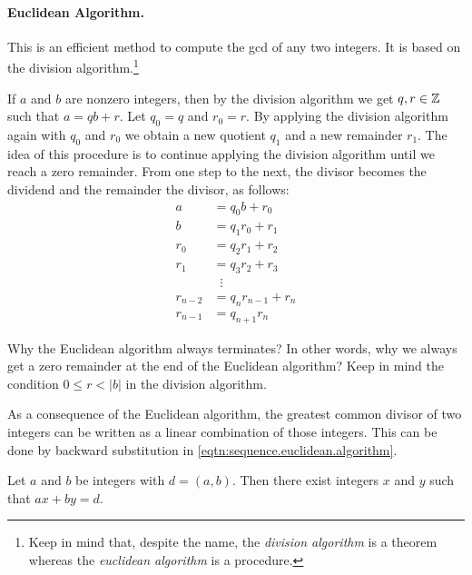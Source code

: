 \documentclass[11pt,a4paper]{article}
\begin{document}
\paragraph{Euclidean Algorithm.} This is an efficient method to compute the gcd of any  two integers.
It is based on the division algorithm.\footnote{Keep in mind that, despite the name, the \textit{division algorithm} is a theorem whereas the \textit{euclidean algorithm} is a procedure.}


If \(a\) and \(b\) are nonzero integers, then by the division algorithm we get \(q,r\in \mathbb{Z}\) such that \(a= qb+r\).
Let \(q_0=q\) and \(r_0=r\).
By applying the division algorithm again with \(q_0\) and \(r_0\) we obtain a new quotient \(q_1\)   and a new remainder \(r_1\).
The idea of this procedure is to continue applying the division algorithm until we reach a zero remainder. From one step to the next,  the divisor becomes the dividend and the remainder the divisor, as follows:
\begin{equation}\label{eqtn:sequence.euclidean.algorithm}
\begin{aligned}
    a & =q_0 b+r_0 \\
    b & =q_1 r_0+r_1 \\
    r_0 & =q_2 r_1+r_2 \\
    r_1 & =q_3 r_2+r_3 \\
    &\;\; \vdots \\
    r_{n-2} & =q_n r_{n-1}+r_n \\
    r_{n-1} & =q_{n+1} r_n
\end{aligned}
\end{equation}


\begin{que}
    Why the Euclidean algorithm always terminates? In other words,
    why we always get a zero remainder at the end of the Euclidean algorithm? 
    Keep in mind the condition \(0\leq r < |b|\) in the division algorithm.
\end{que}

As a consequence of the Euclidean algorithm,
the greatest common divisor of two integers can be written as a linear combination of those integers. This can be done by backward substitution in \eqref{eqtn:sequence.euclidean.algorithm}.

\begin{teo}
    Let $a$ and $b$ be integers with $d=(a,b)$. Then there exist integers $x$ and $y$ such that $a x+b y=d$. 
\end{teo}
\end{document}
